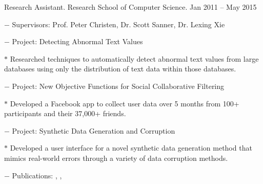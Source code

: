 \documentclass[10pt]{article}
\begin{document}
\begin{innerlist}
	\item Research Assistant. Research School of Computer Science. \hfill {Jan 2011 -- May 2015}
	\begin{innerlist}
		\item[$-$] Supervisors: Prof. Peter Christen, Dr. Scott Sanner, Dr. Lexing Xie
		\item[$-$] Project: Detecting Abnormal Text Values
		\begin{innerlist}
			\item[$*$] Researched techniques to automatically detect abnormal text values from large databases using only the distribution of text data within those databases.
		\end{innerlist}
		\item[$-$] Project: New Objective Functions for Social Collaborative Filtering
		\begin{innerlist}
			\item[$*$] Developed a Facebook app to collect user data over 5 months from 100+ participants and their 37,000+ friends.%
		\end{innerlist}
		\item[$-$] Project: Synthetic Data Generation and Corruption
		\begin{innerlist}
			\item[$*$] Developed a user interface for a novel synthetic data generation method that mimics real-world errors through a variety of data corruption methods.
		\end{innerlist}
		\item[$-$] Publications: \cite{Christen2016}, \cite{Noel2012}, \cite{Tran2013b}
	\end{innerlist}
	

\end{innerlist}
\end{document}
